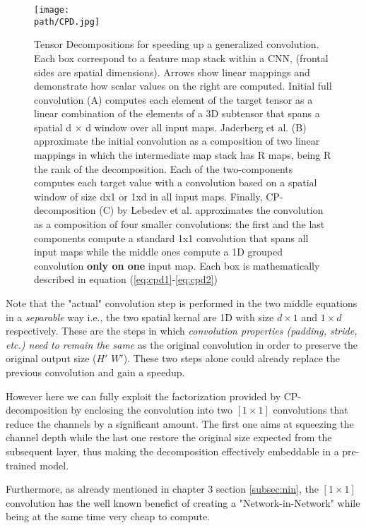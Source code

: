 \begin{figure}[h!]
 \centering
 \texttt{[image: \\path/CPD.jpg]} 
 \caption[CP decomposition application on a CONV layer.]{Tensor Decompositions for speeding up a generalized convolution. Each box correspond to a feature map stack within a CNN, (frontal sides are spatial dimensions). Arrows show linear mappings and demonstrate how scalar values on the right are computed. Initial full convolution (A) computes each element of the target tensor as a linear combination of the elements of a 3D subtensor that spans a spatial d × d window over all input maps. 
Jaderberg et al. (B) approximate the initial convolution as a composition of two linear mappings in which the intermediate map stack has R  maps, being R the rank of the decomposition. Each of the two-components 
computes each target value with a convolution based on a spatial window of size dx1 or 1xd in all input maps. Finally, CP-decomposition (C) by Lebedev et al. approximates the convolution as a composition of four smaller convolutions: the first and the last components compute a standard 1x1 convolution that spans all input maps while the middle ones compute a 1D grouped convolution \textbf{only on one} input map. Each box is mathematically described in equation (\ref{eq:cpd1}-\ref{eq:cpd2})}
 \label{fig:cpd-pass}
\end{figure}
\pagebreak

Note that the "actual" convolution step is performed in the two middle equations in a \emph{separable} way i.e., the two spatial kernal are 1D with size $d \times 1$ and $1 \times d$ respectively. These are the steps in which \emph{convolution properties (padding, stride, etc.) need to remain the same} as the original convolution in order to preserve the original output size ($H'$ $W'$). These two steps alone could already replace the previous convolution and gain a speedup. 
\newline

However here we can fully exploit the factorization provided by CP-decomposition by enclosing the convolution into two $[1 \times 1]$ convolutions that reduce the channels by a significant amount. The first one aims at squeezing the channel depth while the last one restore the original size expected from the subsequent layer, thus making the decomposition effectively embeddable in a pre-trained model. 
\newline 

Furthermore, as already mentioned in chapter 	3 section \ref{subsec:nin}, the $[1 \times 1]$ convolution has the well known benefict of creating a  "Network-in-Network" while being at the same time very cheap to compute. 
\newline 

